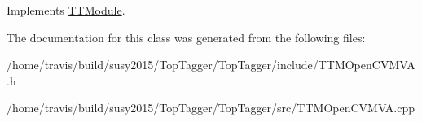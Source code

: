 Implements \hyperlink{classTTModule_a14e7c03fbf4ee1a5008c9344adc7c896}{T\-T\-Module}.



The documentation for this class was generated from the following files\-:\begin{DoxyCompactItemize}
\item 
/home/travis/build/susy2015/\-Top\-Tagger/\-Top\-Tagger/include/T\-T\-M\-Open\-C\-V\-M\-V\-A.\-h\item 
/home/travis/build/susy2015/\-Top\-Tagger/\-Top\-Tagger/src/T\-T\-M\-Open\-C\-V\-M\-V\-A.\-cpp\end{DoxyCompactItemize}
